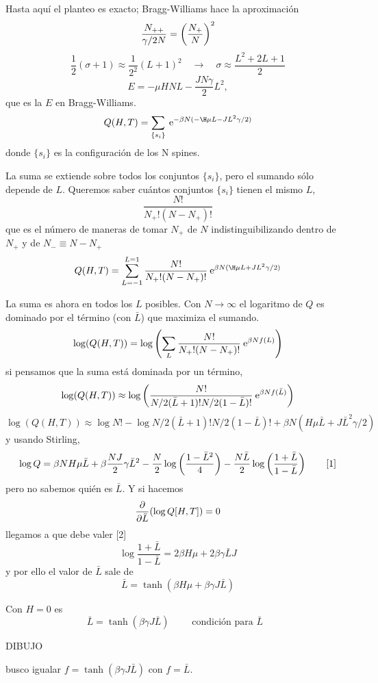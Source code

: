 \documentclass[10pt,oneside]{CBFT_book}
\begin{document}
Hasta aquí el planteo es exacto; Bragg-Williams hace la aproximación
\[
	\frac{N_{++}}{\gamma/2 N}= \left( \frac{ N_+ }{ N } \right)^2
\]
\[
	\frac{1}{2}(\sigma + 1) \approx \frac{1}{2^2} (L+1)^2 \quad \rightarrow \quad 
	\sigma \approx \frac{L^2 + 2L + 1}{2}
\]
\[ 
	\boxed{ E = -\mu H N L - \frac{JN\gamma }{2}L^2 },
\]
que es la $E$ en Bragg-Williams.
\[
	Q(H,T) = \sum_{\{ s_i\}} \euler^{-\beta N(- \H\mu L - JL^2 \gamma / 2) }
\]
donde $\{ s_i\}$ es la configuración de los N spines.

La suma se extiende sobre todos los conjuntos $\{ s_i\}$, pero el sumando sólo depende de $L$.
Queremos saber cuántos conjuntos $\{ s_i\}$ tienen el mismo $L$,
\[
	\frac{N!}{N_+!(N-N_+)!}
\]
que es el número de maneras de tomar $N_+$ de $N$ indistinguibilizando dentro de $N_+$ y de $N_-\equiv
N-N_+$
\[
	Q(H,T) = \sum_{L=-1}^{L=1} \frac{N!}{N_+!(N-N_+)!}
	 \euler^{\beta N( \H\mu L + JL^2 \gamma / 2) }
\]

La suma es ahora en todos los $L$ posibles. Con $N\to\infty$ el logaritmo de $Q$ es dominado por el término
(con $\bar{L}$) que maximiza el sumando.
\[
	\log (Q(H,T)) = \log \left( \sum_L \frac{N!}{N_+!(N-N_+)!} \:\mathrm{e}^{\beta N f(L)} \right)
\]
si pensamos que la suma está dominada por un término,
\[
	\log (Q(H,T)) \approx \log \left( \frac{N!}{ N/2(\bar{L}+1)!N/2(1-\bar{L})!} 
	\:\mathrm{e}^{\beta N f(\bar{L})} \right)
\]
\[
	\log (Q(H,T)) \approx \log N! - \log N/2(\bar{L}+1)!N/2(1-\bar{L})! + 
	\beta N ( H\mu \bar{L} + J\bar{L}^2 \gamma/2 ) 
\]
y usando Stirling,
\[
	\log Q = \beta N H \mu \bar{L} + \beta \frac{NJ}{2} \gamma \bar{L}^2 -
	\frac{N}{2} \log \left( \frac{ 1-\bar{L}^2 }{ 4 } \right) - \frac{N\bar{L}}{2} \log \left( \frac{ 1+\bar{L} }{ 1-\bar{L} } \right)
	\qquad [1]
\]
pero no sabemos quién es $\bar{L}$. Y si hacemos
\[
	\frac{\partial^{\hspace{-0.05em}} {}}{\partial {\bar{L}}^{\hspace{-0.05em}}}( \log Q[H,T] ) = 0
\]
llegamos a que debe valer [2]
\[
	\log \frac{1+\bar{L}}{1-\bar{L}} = 2\beta H\mu + 2\beta \gamma \bar{L} J
\]
y por ello el valor de $\bar{L}$ sale de
\[
	\bar{L} = \tanh( \beta H \mu + \beta \gamma J \bar{L} )
\]

Con $H=0$ es 
\[
	\boxed{ \bar{L} = \tanh( \beta \gamma J \bar{L} ) } \qquad \text{ condición para $\bar{L}$ }
\]

DIBUJO 

busco igualar $f=\tanh(\beta\gamma J\bar{L})$ con $f=\bar{L}$.
\end{document}
